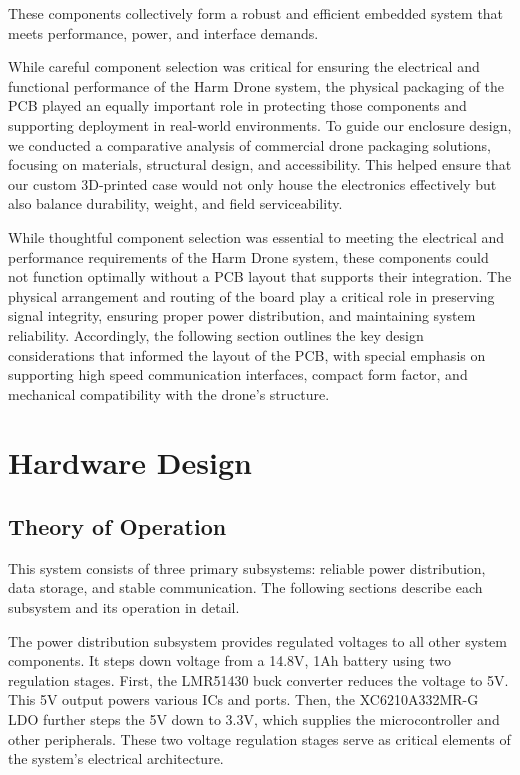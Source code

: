 \documentclass[12pt]{article}
\begin{document}
\par These components collectively form a robust and efficient embedded system that meets performance, power, and interface demands.
\par While careful component selection was critical for ensuring the electrical and functional performance of the Harm Drone system, the physical packaging of the PCB played an equally important role in protecting those components and supporting deployment in real-world environments. To guide our enclosure design, we conducted a comparative analysis of commercial drone packaging solutions, focusing on materials, structural design, and accessibility. This helped ensure that our custom 3D-printed case would not only house the electronics effectively but also balance durability, weight, and field serviceability.
\par While thoughtful component selection was essential to meeting the electrical and performance requirements of the Harm Drone system, these components could not function optimally without a PCB layout that supports their integration. The physical arrangement and routing of the board play a critical role in preserving signal integrity, ensuring proper power distribution, and maintaining system reliability. Accordingly, the following section outlines the key design considerations that informed the layout of the PCB, with special emphasis on supporting high speed communication interfaces, compact form factor, and mechanical compatibility with the drone's structure.
\section{Hardware Design}
\subsection{Theory of Operation}

This system consists of three primary subsystems: reliable power distribution, data storage, and stable communication. The following sections describe each subsystem and its operation in detail.

The power distribution subsystem provides regulated voltages to all other system components. It steps down voltage from a 14.8V, 1Ah battery using two regulation stages. First, the LMR51430 buck converter reduces the voltage to 5V. This 5V output powers various ICs and ports. Then, the XC6210A332MR-G LDO further steps the 5V down to 3.3V, which supplies the microcontroller and other peripherals. These two voltage regulation stages serve as critical elements of the system's electrical architecture.
\end{document}
